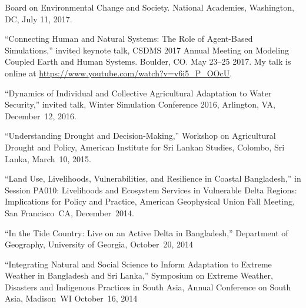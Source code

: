   Board on Environmental Change and Society. National Academies, Washington,
  DC, July 11, 2017.
\item  ``Connecting Human and Natural Systems: The Role of Agent-Based
  Simulations,'' invited keynote talk, CSDMS 2017 Annual Meeting on Modeling
  Coupled Earth and Human Systems. Boulder, CO. May 23--25 2017.
  My talk is online at
  \url{https://www.youtube.com/watch?v=v6i5_P_OOcU}.
\item  ``Dynamics of Individual and Collective Agricultural Adaptation to Water
  Security,'' invited talk, Winter Simulation Conference 2016, Arlington, VA,
  December~12, 2016.
\item ``Understanding Drought and Decision-Making,'' Workshop on Agricultural
  Drought and Policy, American Institute for Sri Lankan Studies, Colombo, Sri
  Lanka, March~10, 2015.
\item ``Land Use, Livelihoods, Vulnerabilities, and Resilience in Coastal
  Bangladesh,'' in Session PA010: Livelihoods and Ecosystem Services in
  Vulnerable Delta Regions: Implications for Policy and Practice, American
  Geophysical Union Fall Meeting, San Francisco~CA, December~2014.
\item ``In the Tide Country: Live on an Active Delta in Bangladesh,''
  Department of Geography, University of Georgia, October~20, 2014
\item ``Integrating Natural and Social Science to Inform Adaptation to Extreme
  Weather in Bangladesh and Sri Lanka,'' Symposium on Extreme Weather,
  Disasters and Indigenous Practices in South Asia, Annual Conference on South
  Asia, Madison~WI October~16, 2014
